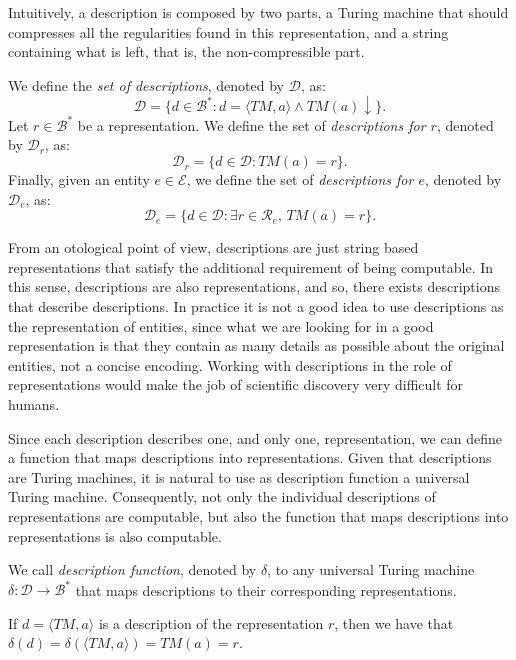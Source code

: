 Intuitively, a description is composed by two parts, a Turing machine that should compresses all the regularities found in this representation, and a string containing what is left, that is, the non-compressible part.

\begin{definition}
\label{def:descriptions_model}
We define the \emph{set of descriptions}, denoted by $\mathcal{D}$, as:
\[
\mathcal{D} = \{ d \in \mathcal{B}^\ast : d = \langle TM,a \rangle \wedge TM(a) \downarrow \}.
\]
Let $r \in \mathcal{B}^\ast$ be a representation. We define the set of \emph{descriptions for $r$}, denoted by $\mathcal{D}_r$, as:
\[
\mathcal{D}_r = \{ d \in \mathcal{D} : TM(a) = r \}.
\]
Finally, given an entity $e \in \mathcal{E}$, we define the set of \emph{descriptions for $e$}, denoted by $\mathcal{D}_e$, as:
\[
\mathcal{D}_e = \{ d \in \mathcal{D} : \exists r \in \mathcal{R}_e,\, TM(a) = r \}.
\]
\end{definition}

From an otological point of view, descriptions are just string based representations that satisfy the additional requirement of being computable. In this sense, descriptions are also representations, and so, there exists descriptions that describe descriptions. In practice it is not a good idea to use descriptions as the representation of entities, since what we are looking for in a good representation is that they contain as many details as possible about the original entities, not a concise encoding. Working with descriptions in the role of representations would make the job of scientific discovery very difficult for humans.

Since each description describes one, and only one, representation, we can define a function that maps descriptions into representations. Given that descriptions are Turing machines, it is natural to use as description function a universal Turing machine. Consequently, not only the individual descriptions of representations are computable, but also the function that maps descriptions into representations is also computable.

\begin{definition}
We call \emph{description function}, denoted by $\delta$, to any universal Turing machine $\delta : \mathcal{D} \rightarrow \mathcal{B}^\ast$ that maps descriptions to their corresponding representations.
\end{definition}

If $d = \langle TM, a \rangle$ is a description of the representation $r$, then we have that $\delta \left( d \right) = \delta \left( \langle TM, a \rangle \right) = TM(a) = r$.

